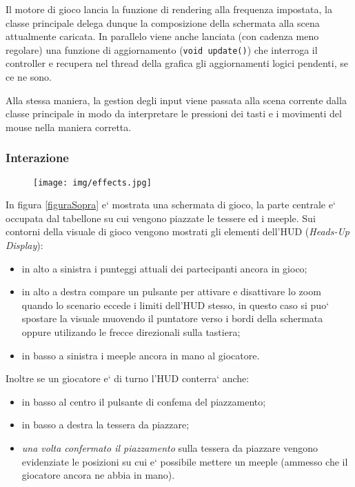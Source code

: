 Il motore di gioco lancia la funzione di rendering alla frequenza impostata, la classe principale
delega dunque la composizione della schermata alla scena attualmente caricata.
In parallelo viene anche lanciata (con cadenza meno regolare) una funzione di aggiornamento (\texttt{void update()}) che interroga il controller e recupera nel thread della grafica gli aggiornamenti logici pendenti, se ce ne sono.

Alla stessa maniera, la gestion degli input viene passata alla scena corrente dalla classe principale in modo da interpretare le pressioni dei tasti e i movimenti del mouse nella maniera corretta.

\subsubsection{Interazione}
\begin{figure}
	\texttt{[image: img/effects.jpg]}
\end{figure}

In figura \ref{figuraSopra} e` mostrata una schermata di gioco, la parte centrale e` occupata dal tabellone su cui vengono piazzate le tessere ed i meeple. 
Sui contorni della visuale di gioco vengono mostrati gli elementi dell'HUD (\emph{Heads-Up Display}): 
\begin{itemize}
\item in alto a sinistra i punteggi attuali dei partecipanti ancora in gioco;
\item in alto a destra compare un pulsante per attivare e disattivare lo zoom quando lo scenario eccede i limiti dell'HUD stesso, in questo caso si puo` spostare la visuale muovendo il puntatore verso i bordi della schermata oppure utilizando le frecce direzionali sulla tastiera;
\item in basso a sinistra i meeple ancora in mano al giocatore.
\end{itemize}
Inoltre se un giocatore e` di turno l'HUD conterra` anche:
\begin{itemize}
\item in basso al centro il pulsante di confema del piazzamento;
\item in basso a destra la tessera da piazzare;
\item \emph{una volta confermato il piazzamento} sulla tessera da piazzare vengono evidenziate le posizioni su cui e` possibile mettere un meeple (ammesso che il giocatore ancora ne abbia in mano).
\end{itemize}

